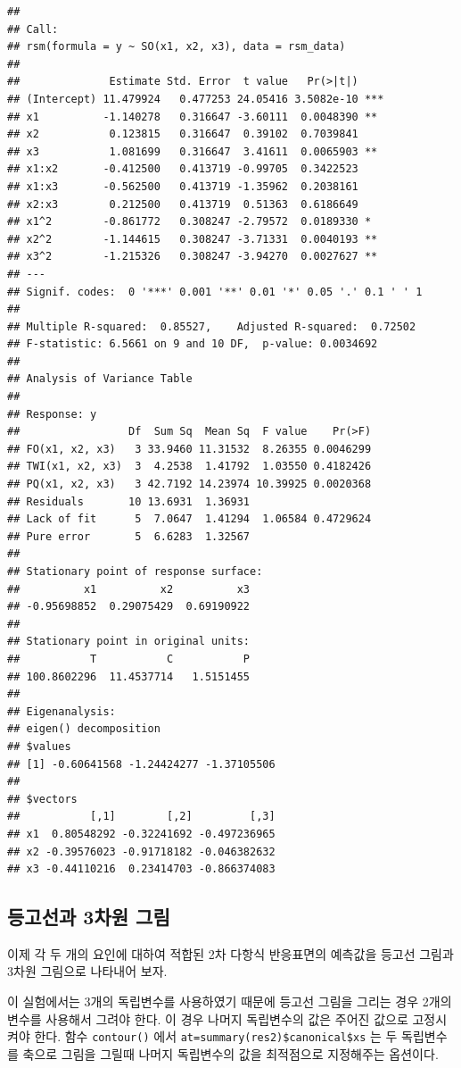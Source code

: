 \documentclass[
]{book}
\theoremstyle{definition}
\theoremstyle{definition}
\theoremstyle{definition}
\theoremstyle{definition}
\theoremstyle{remark}
\begin{document}
\begin{verbatim}
## 
## Call:
## rsm(formula = y ~ SO(x1, x2, x3), data = rsm_data)
## 
##              Estimate Std. Error  t value   Pr(>|t|)    
## (Intercept) 11.479924   0.477253 24.05416 3.5082e-10 ***
## x1          -1.140278   0.316647 -3.60111  0.0048390 ** 
## x2           0.123815   0.316647  0.39102  0.7039841    
## x3           1.081699   0.316647  3.41611  0.0065903 ** 
## x1:x2       -0.412500   0.413719 -0.99705  0.3422523    
## x1:x3       -0.562500   0.413719 -1.35962  0.2038161    
## x2:x3        0.212500   0.413719  0.51363  0.6186649    
## x1^2        -0.861772   0.308247 -2.79572  0.0189330 *  
## x2^2        -1.144615   0.308247 -3.71331  0.0040193 ** 
## x3^2        -1.215326   0.308247 -3.94270  0.0027627 ** 
## ---
## Signif. codes:  0 '***' 0.001 '**' 0.01 '*' 0.05 '.' 0.1 ' ' 1
## 
## Multiple R-squared:  0.85527,    Adjusted R-squared:  0.72502 
## F-statistic: 6.5661 on 9 and 10 DF,  p-value: 0.0034692
## 
## Analysis of Variance Table
## 
## Response: y
##                 Df  Sum Sq  Mean Sq  F value    Pr(>F)
## FO(x1, x2, x3)   3 33.9460 11.31532  8.26355 0.0046299
## TWI(x1, x2, x3)  3  4.2538  1.41792  1.03550 0.4182426
## PQ(x1, x2, x3)   3 42.7192 14.23974 10.39925 0.0020368
## Residuals       10 13.6931  1.36931                   
## Lack of fit      5  7.0647  1.41294  1.06584 0.4729624
## Pure error       5  6.6283  1.32567                   
## 
## Stationary point of response surface:
##          x1          x2          x3 
## -0.95698852  0.29075429  0.69190922 
## 
## Stationary point in original units:
##           T           C           P 
## 100.8602296  11.4537714   1.5151455 
## 
## Eigenanalysis:
## eigen() decomposition
## $values
## [1] -0.60641568 -1.24424277 -1.37105506
## 
## $vectors
##           [,1]        [,2]         [,3]
## x1  0.80548292 -0.32241692 -0.497236965
## x2 -0.39576023 -0.91718182 -0.046382632
## x3 -0.44110216  0.23414703 -0.866374083
\end{verbatim}

\hypertarget{uxb4f1uxace0uxc120uxacfc-3uxcc28uxc6d0-uxadf8uxb9bc}{%
\subsection{등고선과 3차원 그림}\label{uxb4f1uxace0uxc120uxacfc-3uxcc28uxc6d0-uxadf8uxb9bc}}

이제 각 두 개의 요인에 대하여 적합된 2차 다항식 반응표면의 예측값을 등고선 그림과 3차원 그림으로 나타내어 보자.

이 실험에서는 3개의 독립변수를 사용하였기 때문에 등고선 그림을 그리는 경우 2개의 변수를 사용해서 그려야 한다. 이 경우 나머지 독립변수의 값은 주어진 값으로 고정시켜야 한다. 함수 \texttt{contour()} 에서 \texttt{at=summary(res2)\$canonical\$xs} 는 두 독립변수를 축으로 그림을 그릴때 나머지 독립변수의 값을 최적점으로 지정해주는 옵션이다.
\end{document}
